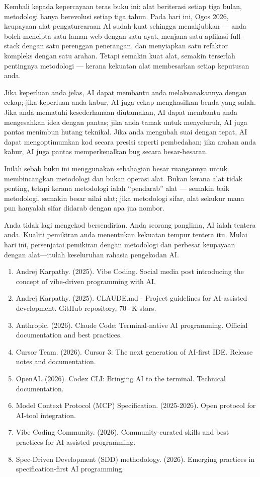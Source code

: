
Kembali kepada kepercayaan teras buku ini: alat beriterasi setiap tiga bulan, metodologi hanya berevolusi setiap tiga tahun. Pada hari ini, Ogos 2026, keupayaan alat pengaturcaraan AI sudah kuat sehingga menakjubkan — anda boleh mencipta satu laman web dengan satu ayat, menjana satu aplikasi full-stack dengan satu perenggan penerangan, dan menyiapkan satu refaktor kompleks dengan satu arahan. Tetapi semakin kuat alat, semakin terserlah pentingnya metodologi — kerana kekuatan alat membesarkan setiap keputusan anda.

Jika keperluan anda jelas, AI dapat membantu anda melaksanakannya dengan cekap; jika keperluan anda kabur, AI juga cekap menghasilkan benda yang salah. Jika anda mematuhi kesederhanaan diutamakan, AI dapat membantu anda mengesahkan idea dengan pantas; jika anda tamak untuk menyeluruh, AI juga pantas menimbun hutang teknikal. Jika anda mengubah suai dengan tepat, AI dapat mengoptimumkan kod secara presisi seperti pembedahan; jika arahan anda kabur, AI juga pantas memperkenalkan bug secara besar-besaran.

Inilah sebab buku ini menggunakan sebahagian besar ruangannya untuk membincangkan metodologi dan bukan operasi alat. Bukan kerana alat tidak penting, tetapi kerana metodologi ialah “pendarab” alat — semakin baik metodologi, semakin besar nilai alat; jika metodologi sifar, alat sekukur mana pun hanyalah sifar didarab dengan apa jua nombor.

Anda tidak lagi mengekod bersendirian. Anda seorang panglima, AI ialah tentera anda. Kualiti pemikiran anda menentukan kekuatan tempur tentera itu. Mulai hari ini, persenjatai pemikiran dengan metodologi dan perbesar keupayaan dengan alat—itulah keseluruhan rahasia pengekodan AI.


\begin{enumerate}
  \item Andrej Karpathy. (2025). Vibe Coding. Social media post introducing the concept of vibe-driven programming with AI.
  \item Andrej Karpathy. (2025). CLAUDE.md - Project guidelines for AI-assisted development. GitHub repository, 70+K stars.
  \item Anthropic. (2026). Claude Code: Terminal-native AI programming. Official documentation and best practices.
  \item Cursor Team. (2026). Cursor 3: The next generation of AI-first IDE. Release notes and documentation.
  \item OpenAI. (2026). Codex CLI: Bringing AI to the terminal. Technical documentation.
  \item Model Context Protocol (MCP) Specification. (2025-2026). Open protocol for AI-tool integration.
  \item Vibe Coding Community. (2026). Community-curated skills and best practices for AI-assisted programming.
  \item Spec-Driven Development (SDD) methodology. (2026). Emerging practices in specification-first AI programming.
\end{enumerate}

